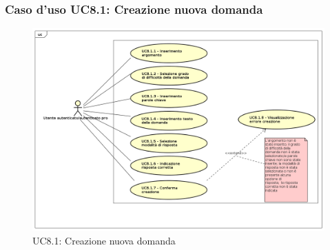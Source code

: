 \subsubsection{Caso d'uso UC8.1: Creazione nuova domanda}
	\label{UC8.1}
	\begin{figure}[h]
		\centering
			\includegraphics[scale=0.45,keepaspectratio]{UML/UC8_1.png}
		\caption{UC8.1: Creazione nuova domanda}
	\end{figure}
	\FloatBarrier
